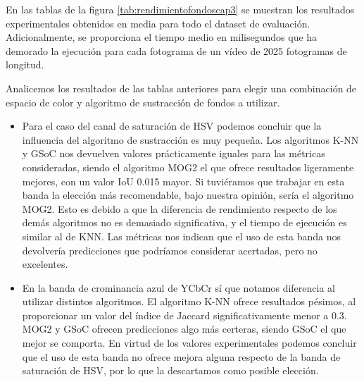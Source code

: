 En las tablas de la figura \ref{tab:rendimientofondoscap3} se muestran los resultados experimentales obtenidos en media para todo el dataset de evaluación. Adicionalmente, se proporciona el tiempo medio en milisegundos que ha demorado la ejecución para cada fotograma de un vídeo de 2025 fotogramas de longitud. 

Analicemos los resultados de las tablas anteriores para elegir una combinación de espacio de color y algoritmo de sustracción de fondos a utilizar.
\begin{itemize}
    \item Para el caso del canal de saturación de HSV podemos concluir que la influencia del algoritmo de sustracción es muy pequeña. Los algoritmos K-NN y GSoC nos devuelven valores prácticamente iguales para las métricas consideradas, siendo el algoritmo MOG2 el que ofrece resultados ligeramente mejores, con un valor IoU 0.015 mayor. Si tuviéramos que trabajar en esta banda la elección más recomendable, bajo nuestra opinión, sería el algoritmo MOG2. Esto es debido a que la diferencia de rendimiento respecto de los demás algoritmos no es demasiado significativa, y el tiempo de ejecución es similar al de KNN. Las métricas nos indican que el uso de esta banda nos devolvería predicciones que podríamos considerar acertadas, pero no excelentes.
    \item En la banda de crominancia azul de YCbCr sí que notamos diferencia al utilizar distintos algoritmos. El algoritmo K-NN ofrece resultados pésimos, al proporcionar un valor del índice de Jaccard significativamente menor a 0.3. MOG2 y GSoC ofrecen predicciones algo más certeras, siendo GSoC el que mejor se comporta. En virtud de los valores experimentales podemos concluir que el uso de esta banda no ofrece mejora alguna respecto de la banda de saturación de HSV, por lo que la descartamos como posible elección.

\end{itemize}
